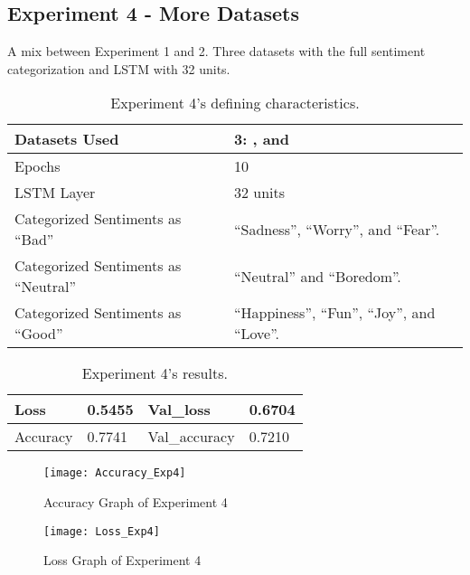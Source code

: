\subsection{Experiment 4 - More Datasets}
\label{exp4}
A mix between Experiment 1 and 2. Three datasets with the full sentiment categorization and LSTM with 32 units.
\begin{table}[!h]
	\caption{Experiment 4's defining characteristics.}
	\vspace{0.5cm}
	\centering
	\begin{tabular}[t]{|l|l|}
	\hline
		Datasets Used & \makecell{3: \citet{d1}, \citet{d2} and\\ \citet{d3}}
	\\ \hline
		Epochs & 10
	\\ \hline
		LSTM Layer & 32 units
	\\ \hline
		Categorized Sentiments as ``Bad'' & ``Sadness'', ``Worry'', and ``Fear''.
	\\ \hline	
		 Categorized Sentiments as ``Neutral'' & ``Neutral'' and ``Boredom''.
	\\ \hline	
		Categorized Sentiments as ``Good'' & ``Happiness'', ``Fun'', ``Joy'', and ``Love''.
	\\ \hline
	\end{tabular}
\end{table}

\begin{table}[!b]
	\caption{Experiment 4's results.}
	\vspace{0.5cm}
	\centering
	\begin{tabular}[t]{|l|l|l|l|}
	\hline
		Loss & 0.5455 & Val\_loss & 0.6704
	\\ \hline
		Accuracy & 0.7741 & Val\_accuracy & 0.7210
	\\ \hline
	\end{tabular}
\end{table}


\begin{figure}[!h]
	\centering
	\texttt{[image: Accuracy\_Exp4]}
	\caption{Accuracy Graph of Experiment 4}
	\label{fig:accuracy_exp4}
	\texttt{[image: Loss\_Exp4]}
	\caption{Loss Graph of Experiment 4}
	\label{fig:loss_exp4}
\end{figure}
\pagebreak

